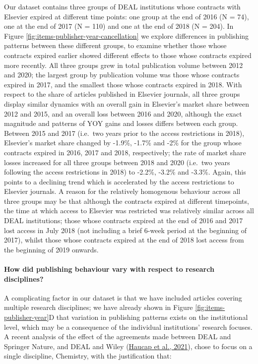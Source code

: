 \documentclass[
]{article}
\begin{document}
Our dataset contains three groups of DEAL institutions whose contracts with Elsevier expired at different time points: one group at the end of 2016 (N = 74), one at the end of 2017 (N = 110) and one at the end of 2018 (N = 204). In Figure \ref{fig:items-publisher-year-cancellation} we explore differences in publishing patterns between these different groups, to examine whether those whose contracts expired earlier showed different effects to those whose contracts expired more recently. All three groups grew in total publication volume between 2012 and 2020; the largest group by publication volume was those whose contracts expired in 2017, and the smallest those whose contracts expired in 2018. With respect to the share of articles published in Elsevier journals, all three groups display similar dynamics with an overall gain in Elsevier's market share between 2012 and 2015, and an overall loss between 2016 and 2020, although the exact magnitude and patterns of YOY gains and losses differs between each group. Between 2015 and 2017 (i.e.~two years prior to the access restrictions in 2018), Elsevier's market share changed by -1.9\%, -1.7\% and -2\% for the group whose contracts expired in 2016, 2017 and 2018, respectively; the rate of market share losses increased for all three groups between 2018 and 2020 (i.e.~two years following the access restrictions in 2018) to -2.2\%, -3.2\% and -3.3\%. Again, this points to a declining trend which is accelerated by the access restrictions to Elsevier journals. A reason for the relatively homogenous behaviour across all three groups may be that although the contracts expired at different timepoints, the time at which access to Elsevier was restricted was relatively similar across all DEAL institutions; those whose contracts expired at the end of 2016 and 2017 lost access in July 2018 (not including a brief 6-week period at the beginning of 2017), whilst those whose contracts expired at the end of 2018 lost access from the beginning of 2019 onwards.

\hypertarget{how-did-publishing-behaviour-vary-with-respect-to-research-disciplines}{%
\paragraph{How did publishing behaviour vary with respect to research disciplines?}\label{how-did-publishing-behaviour-vary-with-respect-to-research-disciplines}}

A complicating factor in our dataset is that we have included articles covering multiple research disciplines; we have already shown in Figure \ref{fig:items-publisher-year}D that variation in publishing patterns exists on the institutional level, which may be a consequence of the individual institutions' research focuses. A recent analysis of the effect of the agreements made between DEAL and Springer Nature, and DEAL and Wiley (\href{https://www.cesifo.org/en/publikationen/2021/working-paper/impact-german-deal-competition-academic-publishing-market}{Haucap et al., 2021}), chose to focus on a single discipline, Chemistry, with the justification that:
\end{document}
